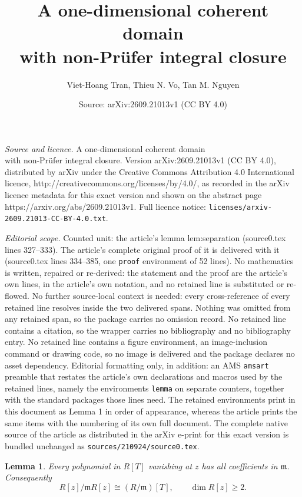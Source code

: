 \documentclass[10pt,a4paper]{amsart}
\title{A one-dimensional coherent domain\\ with non-Pr\"ufer integral closure}
\author{Viet-Hoang Tran, Thieu N. Vo, Tan M. Nguyen}
\date{Source: arXiv:2609.21013v1 (CC BY 4.0)}
\newtheorem{lemma}{Lemma}
\newcommand{\mm}{\mathfrak m}
\begin{document}
\maketitle

\noindent\emph{Source and licence.} A one-dimensional coherent domain\\ with non-Pr\"ufer integral closure. Version arXiv:2609.21013v1 (CC BY 4.0), distributed by arXiv under the Creative Commons Attribution 4.0 International licence, http://creativecommons.org/licenses/by/4.0/, as recorded in the arXiv licence metadata for this exact version and shown on the abstract page https://arxiv.org/abs/2609.21013v1. Full licence notice: \texttt{licenses/arxiv-2609.21013-CC-BY-4.0.txt}.\par\smallskip

\noindent\textit{Editorial scope.} Counted unit: the article's lemma lem:separation (source0.tex lines 327--333). The article's complete original proof of it is delivered with it (source0.tex lines 334--385, one \texttt{proof} environment of 52 lines). No mathematics is written, repaired or re-derived: the statement and the proof are the article's own lines, in the article's own notation, and no retained line is substituted or re-flowed.  No further source-local context is needed: every cross-reference of every retained line resolves inside the two delivered spans.  Nothing was omitted from any retained span, so the package carries no omission record.  No retained line contains a citation, so the wrapper carries no bibliography and no bibliography entry.  No retained line contains a figure environment, an image-inclusion command or drawing code, so no image is delivered and the package declares no asset dependency.  Editorial formatting only, in addition: an AMS \texttt{amsart} preamble that restates the article's own declarations and macros used by the retained lines, namely the environments \texttt{lemma} on separate counters, together with the standard packages those lines need.  The retained environments print in this document as Lemma 1 in order of appearance, whereas the article prints the same items with the numbering of its own full document.  The complete native source of the article as distributed in the arXiv e-print for this exact version is bundled unchanged as \texttt{sources/210924/source0.tex}.
\begin{lemma}\label{lem:separation}
Every polynomial in $R[T]$ vanishing at $z$ has all coefficients in
$\mm$. Consequently
\[
 R[z]/\mm R[z]\cong(R/\mm)[T],\qquad \dim R[z]\geq2.
\]
\end{lemma}
\end{document}
